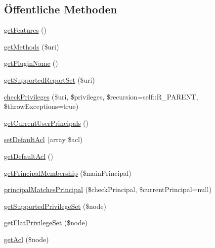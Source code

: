 \subsection*{Öffentliche Methoden}
\begin{DoxyCompactItemize}
\item 
\mbox{\hyperlink{class_sabre_1_1_d_a_v_a_c_l_1_1_plugin_a9c395319fa792d8fb9dad6c8c022e39a}{get\+Features}} ()
\item 
\mbox{\hyperlink{class_sabre_1_1_d_a_v_a_c_l_1_1_plugin_a96fcd7e07ef9e4bb229e5afdff1d41f9}{get\+Methods}} (\$uri)
\item 
\mbox{\hyperlink{class_sabre_1_1_d_a_v_a_c_l_1_1_plugin_a285fd1cc7c8ac248730043dce37af3f9}{get\+Plugin\+Name}} ()
\item 
\mbox{\hyperlink{class_sabre_1_1_d_a_v_a_c_l_1_1_plugin_a449106594e829494885c821b8418b6b3}{get\+Supported\+Report\+Set}} (\$uri)
\item 
\mbox{\hyperlink{class_sabre_1_1_d_a_v_a_c_l_1_1_plugin_a8d77bb09e701afd570dcfd07270ec87f}{check\+Privileges}} (\$uri, \$privileges, \$recursion=self\+::\+R\+\_\+\+P\+A\+R\+E\+NT, \$throw\+Exceptions=true)
\item 
\mbox{\hyperlink{class_sabre_1_1_d_a_v_a_c_l_1_1_plugin_a06163efd74b6638c59ed70286b1046c0}{get\+Current\+User\+Principals}} ()
\item 
\mbox{\hyperlink{class_sabre_1_1_d_a_v_a_c_l_1_1_plugin_ae699a635274bafa76da727b8c6746c8f}{set\+Default\+Acl}} (array \$acl)
\item 
\mbox{\hyperlink{class_sabre_1_1_d_a_v_a_c_l_1_1_plugin_ac828731b3514af22c391cb326a67d4c5}{get\+Default\+Acl}} ()
\item 
\mbox{\hyperlink{class_sabre_1_1_d_a_v_a_c_l_1_1_plugin_a55048aaeec48afba2ae643c7f6ad9abf}{get\+Principal\+Membership}} (\$main\+Principal)
\item 
\mbox{\hyperlink{class_sabre_1_1_d_a_v_a_c_l_1_1_plugin_a94d94881b17838ea3ae115c833804551}{principal\+Matches\+Principal}} (\$check\+Principal, \$current\+Principal=null)
\item 
\mbox{\hyperlink{class_sabre_1_1_d_a_v_a_c_l_1_1_plugin_a5b185fb435651893c01f3ca1ac2146cb}{get\+Supported\+Privilege\+Set}} (\$node)
\item 
\mbox{\hyperlink{class_sabre_1_1_d_a_v_a_c_l_1_1_plugin_a05ac25b54d2b0b24a6f6501f28b1e726}{get\+Flat\+Privilege\+Set}} (\$node)
\item 
\mbox{\hyperlink{class_sabre_1_1_d_a_v_a_c_l_1_1_plugin_afb723560fa23e9ac6e02b599df882023}{get\+Acl}} (\$node)
\item 

\end{DoxyCompactItemize}
